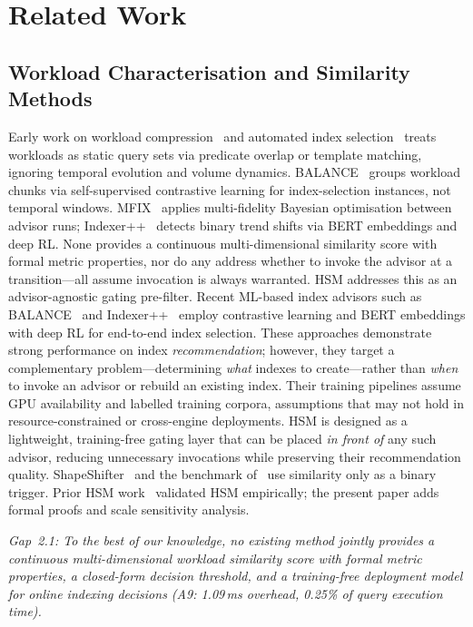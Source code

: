 \documentclass[10pt,twocolumn,a4paper]{article}
\begin{document}
\section{Related Work}

\subsection{Workload Characterisation and Similarity Methods}

Early work on workload compression~\cite{Schnaitter2006COLT} and
automated index selection~\cite{Chaudhuri1997Index} treats workloads as
static query sets via predicate overlap or template matching, ignoring
temporal evolution and volume dynamics. BALANCE~\cite{Wang2024BALANCE}
groups workload chunks via self-supervised contrastive learning for
index-selection instances, not temporal windows. MFIX~\cite{Chang2024MFIX}
applies multi-fidelity Bayesian optimisation between advisor runs;
Indexer++~\cite{Sharma2022IndexerPP} detects binary trend shifts via BERT
embeddings and deep RL. None provides a continuous multi-dimensional
similarity score with formal metric properties, nor do any address whether to invoke the
advisor at a transition---all assume invocation is always warranted. HSM addresses this
as an advisor-agnostic gating pre-filter.
Recent ML-based index advisors such as BALANCE~\cite{Wang2024BALANCE}
and Indexer++~\cite{Sharma2022IndexerPP} employ contrastive learning and
BERT embeddings with deep RL for end-to-end index selection.
These approaches demonstrate strong performance on index
\emph{recommendation}; however, they target a complementary problem---determining
\emph{what} indexes to create---rather than \emph{when} to invoke an
advisor or rebuild an existing index.
Their training pipelines assume GPU availability and labelled training
corpora, assumptions that may not hold in resource-constrained or
cross-engine deployments.
HSM is designed as a lightweight, training-free gating layer that can be
placed \emph{in front of} any such advisor, reducing unnecessary
invocations while preserving their recommendation quality.
ShapeShifter~\cite{Wang2025ShapeShifter}
and the benchmark of~\cite{Brucato2025WorkloadSim} use similarity only as
a binary trigger. Prior HSM work~\cite{Reungsinkonkarn2026iEEECON,%
Reungsilpkolkarn2026ICICT} validated HSM empirically; the present paper
adds formal proofs and scale sensitivity analysis.

\smallskip\noindent\emph{Gap~2.1: To the best of our knowledge, no
existing method jointly provides a continuous multi-dimensional
workload similarity score with formal metric properties, a closed-form
decision threshold, and a training-free deployment model for online
indexing decisions (A9: 1.09\,ms overhead, 0.25\% of query execution
time).}
\end{document}
